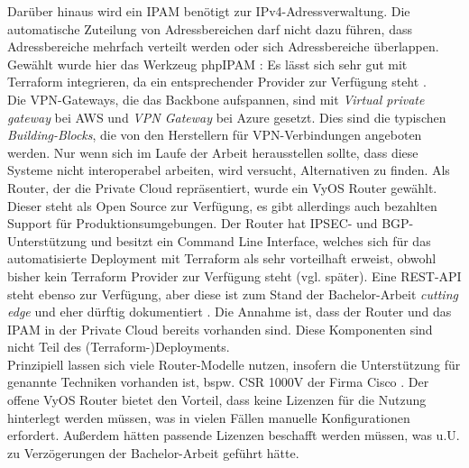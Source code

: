Darüber hinaus wird ein IPAM benötigt zur IPv4-Adressverwaltung. Die automatische Zuteilung von Adressbereichen darf nicht dazu führen, dass Adressbereiche mehrfach verteilt werden oder sich Adressbereiche überlappen. Gewählt wurde hier das Werkzeug phpIPAM \cite{phpipam2020}: Es lässt sich sehr gut mit Terraform integrieren, da ein entsprechender Provider zur Verfügung steht \cite{phpipamtf2020}.\\
Die VPN-Gateways, die das Backbone aufspannen, sind mit \textit{Virtual private gateway} bei AWS und \textit{VPN Gateway} bei Azure gesetzt. Dies sind die typischen \textit{Building-Blocks}, die von den Herstellern für VPN-Verbindungen angeboten werden. Nur wenn sich im Laufe der Arbeit herausstellen sollte, dass diese Systeme nicht interoperabel arbeiten, wird versucht, Alternativen zu finden. Als Router, der die Private Cloud repräsentiert, wurde ein VyOS Router gewählt. Dieser steht als Open Source zur Verfügung, es gibt allerdings auch bezahlten Support für Produktionsumgebungen. Der Router hat IPSEC- und BGP-Unterstützung und besitzt ein Command Line Interface, welches sich für das automatisierte Deployment mit Terraform als sehr vorteilhaft erweist, obwohl bisher kein Terraform Provider zur Verfügung steht (vgl. später). Eine REST-API steht ebenso zur Verfügung, aber diese ist zum Stand der Bachelor-Arbeit \textit{cutting edge} und eher dürftig dokumentiert \cite{vyosapi2021}. Die Annahme ist, dass der Router und das IPAM in der Private Cloud bereits vorhanden sind. Diese Komponenten sind nicht Teil des (Terraform-)Deployments.\\
Prinzipiell lassen sich viele Router-Modelle nutzen, insofern die Unterstützung für genannte Techniken vorhanden ist, bspw. CSR 1000V der Firma Cisco \cite{Durai2016}. Der offene VyOS Router bietet den Vorteil, dass keine Lizenzen für die Nutzung hinterlegt werden müssen, was in vielen Fällen manuelle Konfigurationen erfordert. Außerdem hätten passende Lizenzen beschafft werden müssen, was u.U. zu Verzögerungen der Bachelor-Arbeit geführt hätte.

